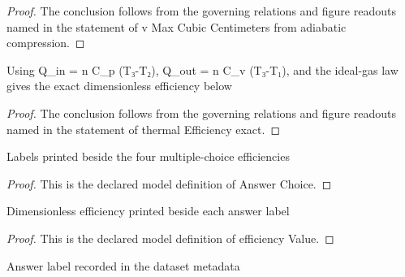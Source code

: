 \begin{proof}
  The conclusion follows from the governing relations and figure readouts named in the statement of v Max Cubic Centimeters from adiabatic compression.
\end{proof}
\begin{lemma}
  \label{lem:physics:phyx-mini-0434:phyxminiproblems-problemphyxmini0434-thermalefficiency-exact}
  Using Q\_in = n C\_p (T₃-T₂), Q\_out = n C\_v (T₃-T₁), and the ideal-gas law gives the exact dimensionless efficiency below
\end{lemma}
\begin{proof}
  The conclusion follows from the governing relations and figure readouts named in the statement of thermal Efficiency exact.
\end{proof}
\begin{definition}
  \label{def:physics:phyx-mini-0434:phyxminiproblems-problemphyxmini0434-answerchoice}
  Labels printed beside the four multiple-choice efficiencies
\end{definition}
\begin{proof}
  This is the declared model definition of Answer Choice.
\end{proof}
\begin{definition}
  \label{def:physics:phyx-mini-0434:phyxminiproblems-problemphyxmini0434-answerchoice-efficiencyvalue}
  Dimensionless efficiency printed beside each answer label
\end{definition}
\begin{proof}
  This is the declared model definition of efficiency Value.
\end{proof}
\begin{definition}
  \label{def:physics:phyx-mini-0434:phyxminiproblems-problemphyxmini0434-recordedanswerchoice}
  Answer label recorded in the dataset metadata
\end{definition}
